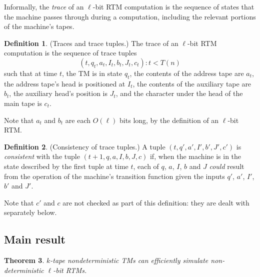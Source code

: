 \documentclass[english]{article}
\theoremstyle{plain}
\newtheorem{thm}{Theorem}
\theoremstyle{definition}
\newtheorem{defn}[thm]{Definition}
\theoremstyle{plain}
\begin{document}
Informally, the \emph{trace} of an $\ell$-bit RTM computation is the
sequence of states that the machine passes through during a
computation, including the relevant portions of the machine's tapes.

\begin{defn}
  (Traces and trace tuples.) The trace of an $\ell$-bit RTM
  computation is the sequence of trace tuples
  \[
  (t,q_t,a_t,I_t,b_t,J_t,c_t): t < T(n)
  \]
  such that at time $t$, the TM is in state $q_t$, the contents of the
  address tape are $a_t$, the address tape's head is positioned at
  $I_t$, the contents of the auxiliary tape are $b_t$, the auxiliary
  head's position is $J_t$, and the character under the head of the
  main tape is $c_t$.
\end{defn}

Note that $a_t$ and $b_t$ are each $O(\ell)$ bits long, by the
definition of an $\ell$-bit RTM.

\begin{defn}
  (Consistency of trace tuples.) A tuple $(t, q', a', I', b', J', c')$
  is \emph{consistent} with the tuple $(t+1, q, a, I, b, J, c)$ if,
  when the machine is in the state described by the first tuple at
  time $t$, each of $q$, $a$, $I$, $b$ and $J$ \emph{could} result
  from the operation of the machine's transition function given the
  inputs $q'$, $a'$, $I'$, $b'$ and $J'$.
\end{defn}

Note that $c'$ and $c$ are not checked as part of this definition:
they are dealt with separately below.

\subsection{Main result}

\begin{thm}
  $k$-tape nondeterministic TMs can efficiently simulate
  non-deterministic $\ell$-bit RTMs.
\end{thm}
\end{document}
